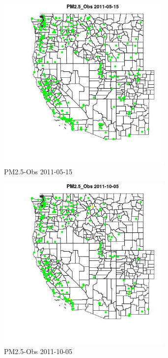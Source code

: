 \begin{figure} 
\centering  
\includegraphics[width=0.77\textwidth]{Code_Outputs/ML_input_report_ML_input_PM25_Step5_part_d_de_duplicated_aves_ML_input_MapObsPM25_Obs2011-05-15.jpg} 
\caption{\label{fig:ML_input_report_ML_input_PM25_Step5_part_d_de_duplicated_aves_ML_inputMapObsPM25_Obs2011-05-15}PM2.5-Obs 2011-05-15} 
\end{figure} 
 

\begin{figure} 
\centering  
\includegraphics[width=0.77\textwidth]{Code_Outputs/ML_input_report_ML_input_PM25_Step5_part_d_de_duplicated_aves_ML_input_MapObsPM25_Obs2011-10-05.jpg} 
\caption{\label{fig:ML_input_report_ML_input_PM25_Step5_part_d_de_duplicated_aves_ML_inputMapObsPM25_Obs2011-10-05}PM2.5-Obs 2011-10-05} 
\end{figure} 
 

